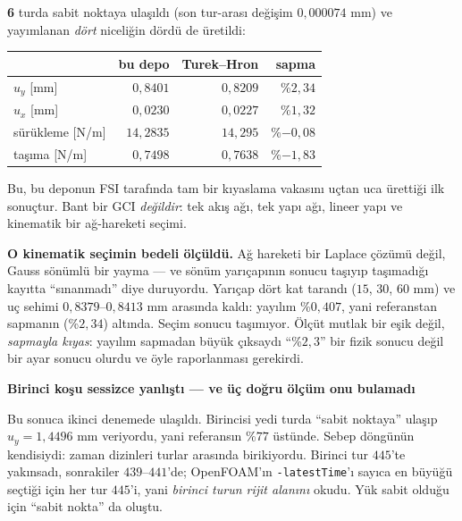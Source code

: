 \documentclass[11pt,a4paper]{article}
\newcommand{\kkkenar}{lacivert}
\newcommand{\kkzemin}{kod}
\newenvironment{renkkutu}[3]{%
  \renewcommand{\kkkenar}{#1}\renewcommand{\kkzemin}{#2}%
  \par\medskip\noindent
  \begin{lrbox}{\kutugovde}%
  \begin{minipage}{\dimexpr\linewidth-2\fboxsep-2\fboxrule\relax}\footnotesize
  \textcolor{#1}{\textbf{#3}}\par\vspace{3pt}%
}{%
  \end{minipage}%
  \end{lrbox}%
  \noindent\fcolorbox{\kkkenar}{\kkzemin}{\usebox{\kutugovde}}%
  \par\medskip
}
\newenvironment{dikkat}[1]{\begin{renkkutu}{orta}{ortabg}{#1}}{\end{renkkutu}}
\begin{document}
\begin{description}
        \noindent \textbf{6} turda sabit noktaya ulaşıldı (son tur-arası
        değişim $0{,}000074$ mm) ve yayımlanan \emph{dört} niceliğin dördü
        de üretildi:

        \begin{center}\small
        \begin{tabular}{lrrr}
        \toprule
        & bu depo & Turek--Hron & sapma \\
        \midrule
        $u_y$ [mm]      & $0{,}8401$  & $0{,}8209$ & \%$2{,}34$ \\
        $u_x$ [mm]      & $0{,}0230$  & $0{,}0227$ & \%$1{,}32$ \\
        sürükleme [N/m] & $14{,}2835$ & $14{,}295$ & \%$-0{,}08$ \\
        taşıma [N/m]    & $0{,}7498$  & $0{,}7638$ & \%$-1{,}83$ \\
        \bottomrule
        \end{tabular}
        \end{center}

        \noindent Bu, bu deponun FSI tarafında tam bir kıyaslama vakasını
        uçtan uca ürettiği ilk sonuçtur. Bant bir GCI \emph{değildir}: tek
        akış ağı, tek yapı ağı, lineer yapı ve kinematik bir ağ-hareketi
        seçimi.

        \noindent \textbf{O kinematik seçimin bedeli ölçüldü.} Ağ hareketi
        bir Laplace çözümü değil, Gauss sönümlü bir yayma --- ve sönüm
        yarıçapının sonucu taşıyıp taşımadığı kayıtta ``sınanmadı'' diye
        duruyordu. Yarıçap dört kat tarandı ($15$, $30$, $60$ mm) ve uç
        sehimi $0{,}8379$--$0{,}8413$ mm arasında kaldı: yayılım
        \%$0{,}407$, yani referanstan sapmanın (\%$2{,}34$) altında. Seçim
        sonucu taşımıyor. Ölçüt mutlak bir eşik değil, \emph{sapmayla
        kıyas}: yayılım sapmadan büyük çıksaydı ``\%$2{,}3$'' bir fizik
        sonucu değil bir ayar sonucu olurdu ve öyle raporlanması
        gerekirdi.

        \begin{dikkat}{Birinci koşu sessizce yanlıştı --- ve üç doğru ölçüm onu bulamadı}
        Bu sonuca ikinci denemede ulaşıldı. Birincisi yedi turda ``sabit
        noktaya'' ulaşıp $u_y = 1{,}4496$ mm veriyordu, yani referansın
        \%$77$ üstünde. Sebep döngünün kendisiydi: zaman dizinleri turlar
        arasında birikiyordu. Birinci tur $445$'te yakınsadı, sonrakiler
        $439$--$441$'de; OpenFOAM'ın \texttt{-latestTime}'ı sayıca en
        büyüğü seçtiği için her tur $445$'i, yani \emph{birinci turun
        rijit alanını} okudu. Yük sabit olduğu için ``sabit nokta'' da
        oluştu.


\end{dikkat}
\end{description}
\end{document}
